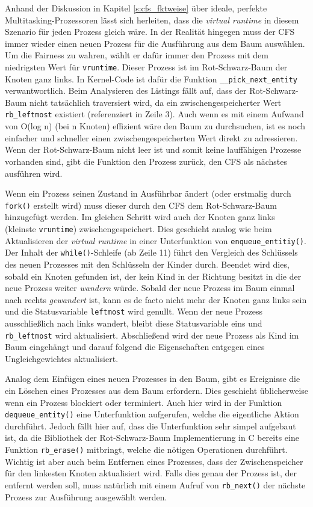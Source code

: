 Anhand der Diskussion in Kapitel \ref{s:cfs_fktweise} über ideale, perfekte Multitasking-Prozessoren lässt sich herleiten, dass die \textit{virtual runtime} in diesem Szenario für jeden Prozess gleich wäre. In der Realität hingegen muss der CFS immer wieder einen neuen Prozess für die Ausführung aus dem Baum auswählen. Um die Fairness zu wahren, wählt er dafür immer den Prozess mit dem niedrigsten Wert für \texttt{vruntime}. Dieser Prozess ist im Rot-Schwarz-Baum der Knoten ganz links. In Kernel-Code ist dafür die Funktion \texttt{\_\_pick\_next\_entity} verwantwortlich. Beim Analysieren des Listings fällt auf, dass der Rot-Schwarz-Baum nicht tatsächlich traversiert wird, da ein zwischengespeicherter Wert \texttt{rb\_leftmost} existiert (referenziert in Zeile 3). Auch wenn es mit einem Aufwand von O(log n) (bei n Knoten) effizient wäre den Baum zu durchsuchen, ist es noch einfacher und schneller einen zwischengespeicherten Wert direkt zu adressieren. Wenn der Rot-Schwarz-Baum nicht leer ist und somit keine lauffähigen Prozesse vorhanden sind, gibt die Funktion den Prozess zurück, den CFS als nächstes ausführen wird.


Wenn ein Prozess seinen Zustand in Ausführbar ändert (oder erstmalig durch \texttt{fork()} erstellt wird) muss dieser durch den CFS dem Rot-Schwarz-Baum hinzugefügt werden. Im gleichen Schritt wird auch der Knoten ganz links (kleinste \texttt{vruntime}) zwischengespeichert. Dies geschieht analog wie beim Aktualisieren der \textit{virtual runtime} in einer Unterfunktion von \texttt{enqueue\_entitiy()}. Der Inhalt der \texttt{while()}-Schleife (ab Zeile 11) führt den Vergleich des Schlüssels des neuen Prozesses mit den Schlüsseln der Kinder durch. Beendet wird dies, sobald ein Knoten gefunden ist, der kein Kind in der Richtung besitzt in die der neue Prozess weiter \textit{wandern} würde. Sobald der neue Prozess im Baum einmal nach rechts \textit{gewandert} ist, kann es de facto nicht mehr der Knoten ganz links sein und die Statusvariable \texttt{leftmost} wird genullt. Wenn der neue Prozess ausschließlich nach links wandert, bleibt diese Statusvariable eins und \texttt{rb\_leftmost} wird aktualisiert. Abschließend wird der neue Prozess als Kind im Baum eingehängt und darauf folgend die Eigenschaften entgegen eines Ungleichgewichtes aktualisiert.


Analog dem Einfügen eines neuen Prozesses in den Baum, gibt es Ereignisse die ein Löschen eines Prozesses aus dem Baum erfordern. Dies geschieht üblicherweise wenn ein Prozess blockiert oder terminiert. Auch hier wird in der Funktion \texttt{dequeue\_entity()} eine Unterfunktion aufgerufen, welche die eigentliche Aktion durchführt. Jedoch fällt hier auf, dass die Unterfunktion sehr simpel aufgebaut ist, da die Bibliothek der Rot-Schwarz-Baum Implementierung in C bereits eine Funktion \texttt{rb\_erase()} mitbringt, welche die nötigen Operationen durchführt. Wichtig ist aber auch beim Entfernen eines Prozesses, dass der Zwischenspeicher für den linkesten Knoten aktualisiert wird. Falls dies genau der Prozess ist, der entfernt werden soll, muss natürlich mit einem Aufruf von \texttt{rb\_next()} der nächste Prozess zur Ausführung ausgewählt werden. 

